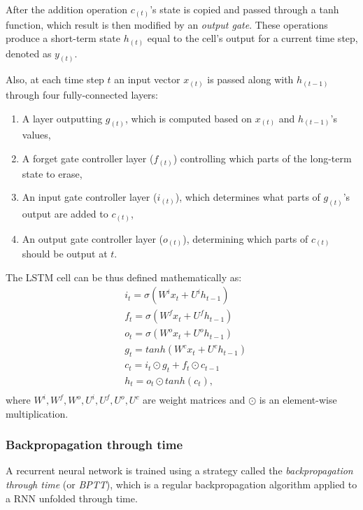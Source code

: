 After the addition operation $c_{(t)}$'s state is copied and passed through a tanh function, which result is then modified by an \emph{output gate}. These operations produce a short-term state $h_{(t)}$ equal to the cell's output for a current time step, denoted as $y_{(t)}$.

Also, at each time step $t$ an input vector $x_{(t)}$ is passed along with $h_{(t-1)}$ through four fully-connected layers:

\begin{enumerate}
\item A layer outputting $g_{(t)}$, which is computed based on $x_{(t)}$ and $h_{(t-1)}$'s values,
\item A forget gate controller layer ($f_{(t)}$) controlling which parts of the long-term state to erase,
\item An input gate controller layer ($i_{(t)}$), which determines what parts of $g_{(t)}$'s output are added to $c_{(t)}$,
\item An output gate controller layer ($o_{(t)}$), determining which parts of $c_{(t)}$ should be output at $t$.
\end{enumerate}

The LSTM cell can be thus defined mathematically as:
\begin{equation}
\begin{split}
&i_t = \sigma(W^ix_t + U^ih_{t-1})\\
&f_t = \sigma(W^fx_t + U^fh_{t-1})\\
&o_t = \sigma(W^ox_t + U^oh_{t-1})\\
&g_t = tanh(W^cx_t + U^ch_{t-1})\\
&c_t = i_t \odot g_t + f_t \odot c_{t-1}\\
&h_t = o_t \odot tanh(c_t),\\
\end{split}
\end{equation}
where $W^i, W^f, W^o, U^i, U^f, U^o, U^c$ are weight matrices and $\odot$ is an element-wise multiplication.

\subsubsection{Backpropagation through time}

A recurrent neural network is trained using a strategy called the \emph{backpropagation through time} (or \emph{BPTT}), which is a regular backpropagation algorithm applied to a RNN unfolded through time.

